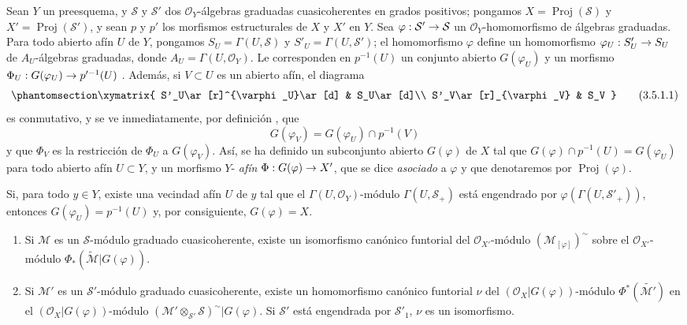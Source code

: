 \documentclass[oneside,10pt]{amsart}
\makeatletter
\newcommand{\ega@arrow}[2]{\mathchoice{#1}{#2}{#2}{#2}}
\renewcommand{\to}{\ega@arrow{\longrightarrow}{\rightarrow}}
\newcommand{\oldpage}[2][]{\marginnote{\normalfont\footnotesize\textbf{#1}~|~#2}\ignorespaces}
\let\EGAOriginalLabel\label
\renewcommand{\label}[1]{\phantomsection\EGAOriginalLabel{#1}}
\makeatother
\begin{document}
\begin{env}[3.5.1]
\label{II.3.5.1-fr}
Sean $Y$ un preesquema, y $\mathcal{S}$ y $\mathcal{S}'$ dos $\mathcal{O}_Y$-álgebras graduadas cuasicoherentes en grados positivos; pongamos $X=\operatorname{Proj}(\mathcal{S})$ y $X'=\operatorname{Proj}(\mathcal{S}')$, y sean $p$ y $p'$ los morfismos estructurales de $X$ y $X'$ en $Y$.
Sea $\varphi:\mathcal{S}'\to\mathcal{S}$ un $\mathcal{O}_Y$-homomorfismo de álgebras graduadas.
Para todo abierto afín $U$ de $Y$, pongamos $S_U=\Gamma(U,\mathcal{S})$ y $S'_U=\Gamma(U,\mathcal{S}')$; el homomorfismo $\varphi$ define un homomorfismo $\varphi_U:S'_U\to S_U$ de $A_U$-álgebras graduadas, donde $A_U=\Gamma(U,\mathcal{O}_Y)$.
Le corresponden en $p^{-1}(U)$ un conjunto abierto $G(\varphi_U)$ y un morfismo $\Phi_U:G(\varphi_U)\to p'^{-1}(U)$ .
Además, si $V\subset U$ es un abierto afín, el diagrama
\[
\label{II.3.5.1.1-fr}
  \xymatrix{
    S'_U\ar[r]^{\varphi_U}\ar[d]
    & S_U\ar[d]\\
    S'_V\ar[r]_{\varphi_V}
    & S_V
  }
\tag{3.5.1.1}
\]
es conmutativo, y se ve inmediatamente, por definición , que
\[
  G(\varphi_V)=G(\varphi_U)\cap p^{-1}(V)
\]
y que $\Phi_V$ es la restricción de $\Phi_U$ a $G(\varphi_V)$.
Así, se ha definido un subconjunto abierto $G(\varphi)$ de $X$ tal que $G(\varphi)\cap p^{-1}(U)=G(\varphi_U)$ para todo abierto afín $U\subset Y$, y un morfismo $Y$-
\oldpage[II]{62}
\emph{afín} $\Phi:G(\varphi)\to X'$, que se dice \emph{asociado} a $\varphi$ y que denotaremos por $\operatorname{Proj}(\varphi)$.

Si, para todo $y\in Y$, existe una vecindad afín $U$ de $y$ tal que el $\Gamma(U,\mathcal{O}_Y)$-módulo $\Gamma(U,\mathcal{S}_+)$ está engendrado por $\varphi(\Gamma(U,\mathcal{S}'_+))$, entonces $G(\varphi_U)=p^{-1}(U)$ y, por consiguiente, $G(\varphi)=X$.
\end{env}

\begin{proposition}[3.5.2]
\label{II.3.5.2-fr}
\medskip\noindent
\begin{enumerate}
  \item[(i)] Si $\mathcal{M}$ es un $\mathcal{S}$-módulo graduado cuasicoherente, existe un isomorfismo canónico funtorial del $\mathcal{O}_{X'}$-módulo $(\mathcal{M}_{[\varphi]})^{\sim}$ sobre el $\mathcal{O}_{X'}$-módulo $\Phi_*(\widetilde{\mathcal{M}}|G(\varphi))$.
  \item[(ii)] Si $\mathcal{M}'$ es un $\mathcal{S}'$-módulo graduado cuasicoherente, existe un homomorfismo canónico funtorial $\nu$ del $(\mathcal{O}_X|G(\varphi))$-módulo $\Phi^*(\widetilde{\mathcal{M}'})$ en el $(\mathcal{O}_X|G(\varphi))$-módulo $(\mathcal{M}'\otimes_{\mathcal{S}'}\mathcal{S})^{\sim}|G(\varphi)$.
    Si $\mathcal{S}'$ está engendrada por $\mathcal{S}'_1$, $\nu$ es un isomorfismo.
\end{enumerate}
\end{proposition}
\end{document}
